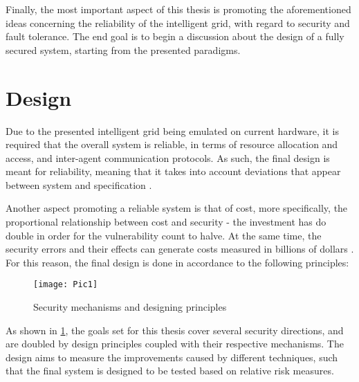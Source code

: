 Finally, the most important aspect of this thesis is promoting the aforementioned ideas concerning the reliability of the intelligent grid,
with regard to security and fault tolerance. The end goal is to begin a discussion about the design of a fully secured system, starting
from the presented paradigms.

\section{Design}

Due to the presented intelligent grid being emulated on current hardware, it is required that the overall system is reliable, in terms of
resource allocation and access, and inter-agent communication protocols. As such, the final design is meant for reliability, meaning that
it takes into account deviations that appear between system and specification \cite{36, 113}.

Another aspect promoting a reliable system is that of cost, more specifically, the proportional relationship between cost and security -
the investment has do double in order for the vulnerability count to halve. At the same time, the security errors and their effects can
generate costs measured in billions of dollars \cite{113, 114}. For this reason, the final design is done in accordance to the following
principles:

\begin{figure}[H]
	\texttt{[image: Pic1]}
	\caption{Security mechanisms and designing principles \label{fig:designPrinciples}}
\end{figure}

As shown in \cref{fig:designPrinciples}, the goals set for this thesis cover several security directions, and are doubled by design principles
coupled with their respective mechanisms. The design aims to measure the improvements caused by different techniques, such that the final
system is designed to be tested based on relative risk measures.


